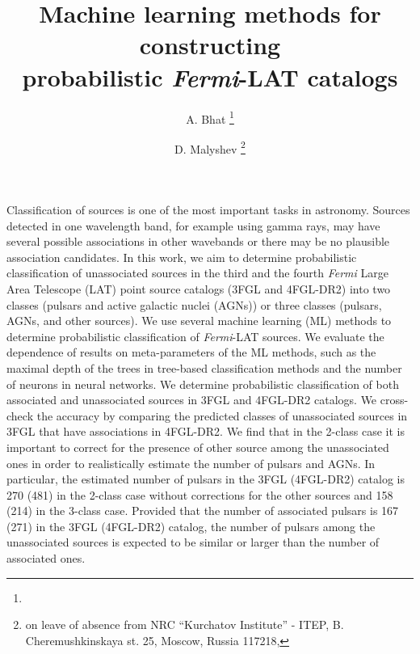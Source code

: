 \documentclass[preprint]{aa}
\newcommand{\Fermi}{\textit{Fermi}\xspace}
\begin{document}
 



   \title{Machine learning methods for constructing \\ probabilistic \Fermi-LAT catalogs}



   \author{A. Bhat \thanks{}
          \and
          D. Malyshev \thanks{on leave of absence from NRC ``Kurchatov Institute'' - ITEP, B. Cheremushkinskaya st. 25, Moscow, Russia 117218, 
          }
          }




 
\abstract
{
Classification of sources is one of the most important tasks in astronomy.
Sources detected in one wavelength band, for example using gamma rays, may have several possible associations in other wavebands or
there may be no plausible association candidates.
}
{
In this work, we aim to determine probabilistic classification of unassociated sources in the third and the fourth \Fermi Large Area Telescope (LAT) point source catalogs (3FGL and 4FGL-DR2) into two classes (pulsars and active galactic nuclei (AGNs)) or three classes (pulsars, AGNs, and other sources).
}
{
We use several machine learning (ML) methods to determine probabilistic classification of \Fermi-LAT sources.
We evaluate the dependence of results on meta-parameters of the ML methods, such as the maximal depth of the trees in tree-based classification methods and the number of neurons in neural networks.
}
{
We determine probabilistic classification of both associated and unassociated sources in 3FGL and 4FGL-DR2 catalogs.
We cross-check the accuracy by comparing the predicted classes of unassociated sources in 3FGL that have associations in 4FGL-DR2.
We find that in the 2-class case it is important to correct for the presence of other source among the unassociated ones in order to realistically estimate
the number of pulsars and AGNs.
In particular, the estimated number of pulsars in the 3FGL (4FGL-DR2) catalog is 270 (481) in the 2-class case without corrections for the other sources and 158 (214) in the 3-class case.
Provided that the number of associated pulsars is 167 (271) in the 3FGL (4FGL-DR2) catalog,
the number of pulsars among the unassociated sources is expected to be similar or larger than the number of associated ones. 
}
{}
\end{document}
